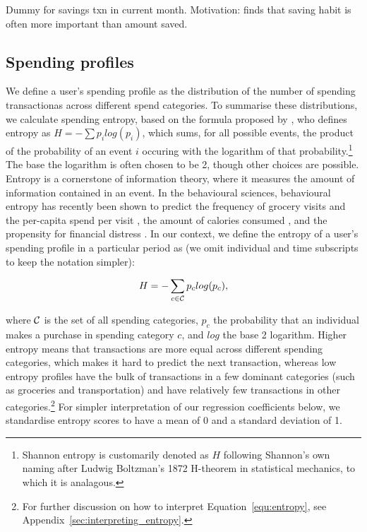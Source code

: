 Dummy for savings txn in current month. Motivation: \citet{mps2018building} finds that
saving habit is often more important than amount saved.


\subsection{Spending profiles}%
\label{sub:spending_profiles}

We define a user's spending profile as the distribution of the number of
spending transactionas across different spend categories. To summarise these
distributions, we calculate spending entropy, based on the formula proposed by
\citet{shannon1948mathematical}, who defines entropy as $H =
-\sum{p_i}log(p_i)$, which sums, for all possible events, the product of the
probability of an event $i$ occuring with the logarithm of that
probability.\footnote{Shannon entropy is customarily denoted as $H$ following
Shannon's own naming after Ludwig Boltzman's 1872 H-theorem in statistical
mechanics, to which it is analagous.} The base the logarithm is often chosen to
be 2, though other choices are possible. Entropy is a cornerstone of
information theory, where it measures the amount of information contained in an
event. In the behavioural sciences, behavioural entropy has recently been shown
to predict the frequency of grocery visits and the per-capita spend per visit
\citep{guidotti2015behavioral}, the amount of calories consumed
\citep{skatova2019those}, and the propensity for financial distress
\citep{muggleton2020evidence}. In our context, we define the entropy of a
user's spending profile in a particular period as (we omit individual
and time subscripts to keep the notation simpler):

\begin{equation}
\label{equ:entropy}
H = -\sum_{c \in \mathcal{C}}{p_c}log(p_c),
\end{equation}

\noindent where $\mathcal{C}$ is the set of all spending categories, $p_c$ the
probability that an individual makes a purchase in spending category $c$, and
$log$ the base 2 logarithm. Higher entropy means that transactions are more
equal across different spending categories, which makes it hard to predict the
next transaction, whereas low entropy profiles have the bulk of transactions in
a few dominant categories (such as groceries and transportation) and have
relatively few transactions in other categories.\footnote{For further
discussion on how to interpret Equation~\ref{equ:entropy}, see
Appendix~\ref{sec:interpreting_entropy}.} For simpler interpretation of our
regression coefficients below, we standardise entropy scores to have a mean of
0 and a standard deviation of 1.

